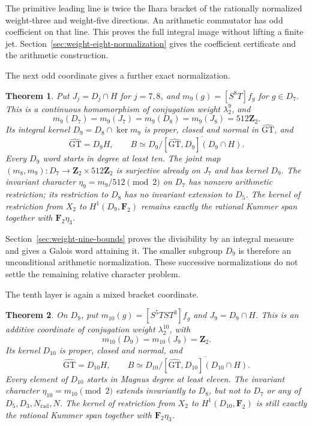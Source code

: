 \documentclass[11pt,a4paper]{article}
\newtheorem{theorem}{Theorem}[section]
\theoremstyle{definition}
\theoremstyle{remark}
\newcommand{\GT}{\widehat{\mathrm{GT}}}
\newcommand{\Z}{\mathbf Z}
\newcommand{\F}{\mathbf F}
\begin{document}
The primitive leading line is twice the Ihara bracket of the rationally
normalized weight-three and weight-five directions. An arithmetic
commutator has odd coefficient on that line. This proves the full
integral image without lifting a finite jet. Section~\ref{sec:weight-eight-normalization}
gives the coefficient certificate and the arithmetic construction.

The next odd coordinate gives a further exact normalization.

\begin{theorem}\label{prop:main-weight-nine-bounds}
Put $J_j=D_j\cap H$ for $j=7,8$, and
$m_9(g)=[S^8T]f_g$ for $g\in D_7$.
This is a continuous homomorphism of conjugation weight $\lambda_2^9$,
and
\[
 m_9(D_7)=m_9(J_7)=m_9(D_8)=m_9(J_8)=512\Z_2.
\]
Its integral kernel $D_9=D_8\cap\ker m_9$ is proper, closed and
normal in $\GT$, and
\[
 \GT=D_9H,\qquad
 B\simeq D_9/\overline{[\GT,D_9](D_9\cap H)}.
\]
Every $D_9$ word starts in degree at least ten.
The joint map $(m_8,m_9):D_7\to\Z_2\times512\Z_2$
is surjective already on $J_7$ and has kernel $D_9$.
The invariant character $\eta_9=m_9/512\pmod2$ on $D_7$
has nonzero arithmetic restriction; its restriction to $D_8$
has no invariant extension to $D_5$.
The kernel of restriction from $X_2$ to $H^1(D_9,\F_2)$
remains exactly the rational Kummer span together with $\F_2\eta_3$.
\end{theorem}

Section~\ref{sec:weight-nine-bounds} proves the divisibility by an
integral measure and gives a Galois word attaining it. The smaller subgroup $D_9$ is therefore an unconditional
arithmetic normalization. These successive normalizations do not
settle the remaining relative character problem.

The tenth layer is again a mixed bracket coordinate.

\begin{theorem}\label{thm:main-weight-ten-normalization}
On $D_9$, put $m_{10}(g)=[S^5TST^3]f_g$ and $J_9=D_9\cap H$.
This is an additive coordinate of conjugation weight $\lambda_2^{10}$,
with
\[
 m_{10}(D_9)=m_{10}(J_9)=\Z_2.
\]
Its kernel $D_{10}$ is proper, closed and normal, and
\[
 \GT=D_{10}H,\qquad
 B\simeq D_{10}/\overline{[\GT,D_{10}](D_{10}\cap H)}.
\]
Every element of $D_{10}$ starts in Magnus degree at least eleven.
The invariant character $\eta_{10}=m_{10}\pmod2$ extends invariantly
to $D_8$, but not to $D_7$ or any of $D_5,D_3,N_{\mathrm{rad}},N$. The kernel of
restriction from $X_2$ to $H^1(D_{10},\F_2)$ is still exactly the
rational Kummer span together with $\F_2\eta_3$.
\end{theorem}
\end{document}
